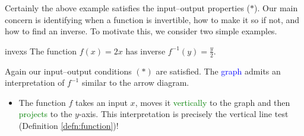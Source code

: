 Certainly the above example satisfies the input--output properties ($\ast$). Our main concern is identifying when a function is invertible, how to make it so if not, and how to find an inverse. To motivate this, we consider two simple examples.



\begin{examples}{}{invexs}
\exstart The function $f(x)=2x$ has inverse $f^{-1}(y)=\frac y2$.
\begin{enumerate}\setcounter{enumi}{1}
\begin{minipage}[t]{0.79\linewidth}\vspace{-10pt}
	\item[]Again our input--output conditions $(\ast)$ are satisfied.\smallbreak
	The \textcolor{blue}{graph} admits an interpretation of $f^{-1}$ similar to the arrow diagram.
	\begin{itemize}\itemsep2pt
	  \item The function $f$ takes an input $x$, moves it \textcolor{Green}{vertically} to the graph and then \textcolor{Green}{projects} to the $y$-axis. This interpretation is precisely the vertical line test (Definition \ref{defn:function})!

\end{itemize}
\end{minipage}
\end{enumerate}
\end{examples}
